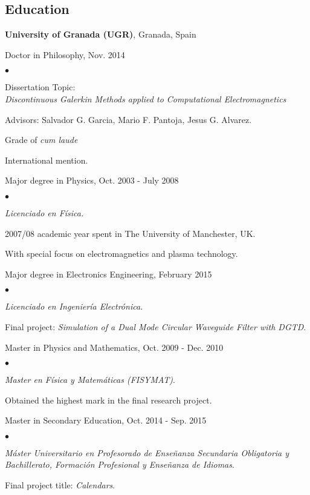 \documentclass[margin,line]{res}
\newenvironment{list2}{
  \begin{list}{$\bullet$}{%
      \setlength{\itemsep}{0in}
      \setlength{\parsep}{0in} \setlength{\parskip}{0in}
      \setlength{\topsep}{0in} \setlength{\partopsep}{0in} 
      \setlength{\leftmargin}{0.2in}}}{\end{list}}
\begin{document}
\begin{resume}
\section{\sc Education}
{\bf University of Granada (UGR)}, Granada, Spain\\
\vspace*{-.1in}
\begin{itemize}
\item Doctor in Philosophy, Nov. 2014
 \begin{list2}
  \vspace*{.05in}
  \item[-] Dissertation Topic: \\{\it Discontinuous Galerkin Methods applied to Computational Electromagnetics}
  \item[-] Advisors:  Salvador G. Garcia, Mario F. Pantoja, Jesus G. Alvarez.
  \item[-] Grade of \textit{cum laude}
  \item[-] International mention.
 \end{list2}
\vspace*{.1in}
\item Major degree in Physics, Oct. 2003 - July 2008
 \begin{list2}
  \item[-] {\it Licenciado en Física.}
  \item[-] 2007/08 academic year spent in The University of Manchester, UK.
  \item[-] With special focus on electromagnetics and plasma technology.
 \end{list2}
 \vspace*{.1in}
\item Major degree in Electronics Engineering, February 2015
 \begin{list2}
  \item[-] {\it Licenciado en Ingeniería Electrónica.}
  \item[-]  Final project: {\it Simulation of a Dual Mode Circular Waveguide Filter with DGTD}.
 \end{list2}
\vspace*{.1in}
 \item Master in Physics and Mathematics, Oct. 2009 - Dec. 2010
 \begin{list2}
  \item[-] {\it Master en Física y Matemáticas (FISYMAT)}. 
  \item[-] Obtained the highest mark in the final research project.
 \end{list2}
\vspace*{.1in}
 \item Master in Secondary Education, Oct. 2014 - Sep. 2015
 \begin{list2}
  \item[-] {\it Máster Universitario en Profesorado de Enseñanza Secundaria Obligatoria y Bachillerato, Formación Profesional y Enseñanza de Idiomas}. 
  \item[-] Final project title: \textit{Calendars}.
 \end{list2}
\end{itemize}


\end{resume}
\end{document}
